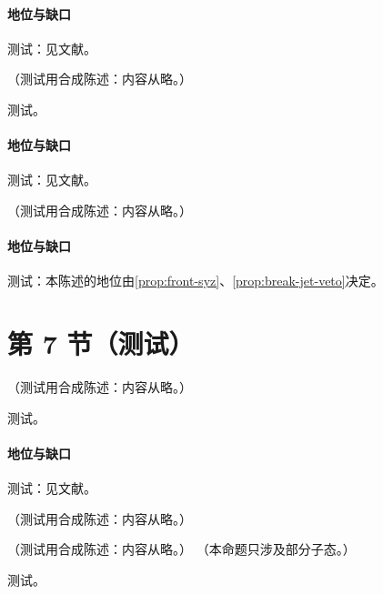 \paragraph{地位与缺口}测试：见文献。

\begin{proposition}\label{prop:front-syz}
（测试用合成陈述：内容从略。）
\end{proposition}
\begin{proofsketch}测试。\end{proofsketch}
\paragraph{地位与缺口}测试：见文献。

\begin{conjecture}\label{conj:front-mpi-violation}
（测试用合成陈述：内容从略。）
\end{conjecture}
\paragraph{地位与缺口}测试：本陈述的地位由\cref{prop:front-syz}、\cref{prop:break-jet-veto}决定。

\section{第 7 节（测试）}\label{sec:front-nlp}

\begin{proposition}\label{prop:front-heavy-fsi}
（测试用合成陈述：内容从略。）
\end{proposition}
\begin{proofsketch}测试。\end{proofsketch}
\paragraph{地位与缺口}测试：见文献。

\begin{remark}\label{rem:front-glauber-status}
（测试用合成陈述：内容从略。）
\end{remark}

\begin{proposition}\label{prop:front-sll-all-orders}
（测试用合成陈述：内容从略。）
（本命题只涉及部分子态。）
\end{proposition}
\begin{proofsketch}测试。\end{proofsketch}

